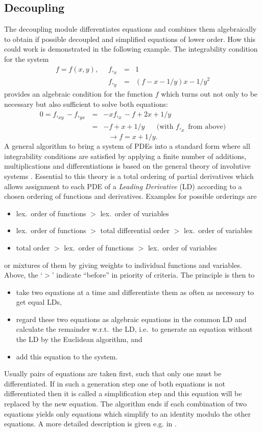 \subsection{Decoupling}
The decoupling module differentiates equations and combines them algebraically
to obtain if possible decoupled and simplified equations of lower order.
How this could work is demonstrated in the following example.
The integrability condition for the system
\[ \begin{array}{cccl}
f = f(x,y), \; \; & f,_{x} & = & 1   \\
                  & f,_{y} & = & (f-x-1/y)x - 1/y^2
\end{array}  \]
provides an algebraic condition for the function $f$
which turns out not only to be necessary but also sufficient to solve both
equations:
\begin{eqnarray*}
 0 = f,_{xy} - f,_{yx} & = & - xf,_x - f + 2x + 1/y \\
                       & = & - f + x + 1/y \; \; \; \; \; \;
 \mbox{(with $f,_x$ from above)}
\end{eqnarray*}
\[ \rightarrow f = x + 1/y. \]
A general algorithm to bring a system of PDEs into a standard form
where all integrability conditions are satisfied by applying
a finite number of additions, multiplications and differentiations
is based on the general theory of involutive systems \cite{Riq,Th,Ja}.
Essential to this theory is a total ordering of partial derivatives
which allows assignment to each PDE of a {\em Leading Derivative}
(LD) according to a chosen ordering of functions
and derivatives. Examples for possible orderings are
\begin{itemize}
\item lex.\ order of functions $>$ lex.\ order of variables
\item lex.\ order of functions $>$ total differential order $>$ lex.\
      order of variables
\item total order $>$ lex.\ order of functions $>$ lex.\ order of variables
\end{itemize}
or mixtures of them by giving weights to individual functions and variables.
Above, the `$>$' indicate ``before'' in priority of criteria. The principle
is then to
\begin{itemize}
\item take two equations at a time and differentiate them as often as
necessary to get equal LDs,
\item regard these two equations as algebraic equations in
the common LD and calculate the remainder w.r.t.\ the LD, i.e.\ to
generate an equation without the LD by the Euclidean algorithm, and
\item add this equation to the system.
\end{itemize}
Usually pairs of equations are taken first, such that only one must be
differentiated. If in such a generation step one of both equations is not
differentiated then it is called a
simplification step and this equation will be replaced by the new equation.
The algorithm ends if each combination of two equations yields only equations
which simplify to an identity modulo the other equations.
A more detailed description is given e.g. in \cite{Alex,Reid1}.

